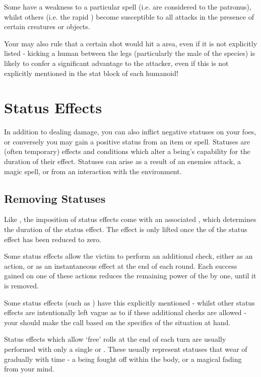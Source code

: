 Some have a weakness to a particular spell (i.e.  are considered  to the patronus), whilst others (i.e. the rapid ) become susceptible to all attacks in the presence of certain creatures or objects. 

Your  may also rule that a certain  shot would hit a  area, even if it is not explicitly listed - kicking a human between the legs (particularly the male of the species) is likely to confer a significant advantage to the attacker, even if this is not explicitly mentioned in the stat block of each humanoid!


\chapter{Status Effects}

In addition to dealing damage, you can also inflict negative statuses on your foes, or conversely you may gain a positive status from an item or spell. Statuses are (often temporary) effects and conditions which alter a being's capability for the duration of their effect. Statuses can arise as a result of an enemies attack, a magic spell, or from an interaction with the environment. 


\section{Removing Statuses}
Like , the imposition of status effects come with an associated , which determines the duration of the status effect. The effect is only lifted once the  of the status effect has been reduced to zero. 

Some status effects allow the victim to perform an additional check, either as an action, or as an instantaneous effect at the end of each round. Each success gained on one of these actions reduces the remaining power of the  by one, until it is removed. 

Some status effects (such as ) have this explicitly mentioned - whilst other status effects are intentionally left vague as to if these additional checks are allowed - your  should make the call based on the specifics of the situation at hand. 

Status effects which allow `free' rolls at the end of each turn are usually performed with only a single  or . These usually represent statuses that wear of gradually with time - a  being fought off within the body, or a magical  fading from your mind. 

